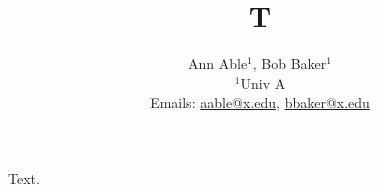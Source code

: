 \documentclass{article}
\title{T}
\author{Ann Able$^1$, Bob Baker$^1$ \\ $^1$Univ A \\ Emails: \href{mailto:aable@x.edu}{aable@x.edu}, \href{mailto:bbaker@x.edu}{bbaker@x.edu}}
\begin{document}
\maketitle
Text.
\end{document}

